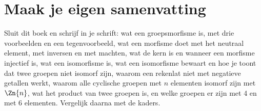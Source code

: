 
\ifzelfstudie
\section*{Maak je eigen samenvatting}
Sluit dit boek en schrijf in je schrift: wat een groepsmorfisme is, met drie voorbeelden en een tegenvoorbeeld, wat een morfisme doet met het neutraal element, met inversen en met machten, wat de kern is en wanneer een morfisme injectief is, wat een isomorfisme is, wat een isomorfisme bewaart en hoe je toont dat twee groepen niet isomorf zijn, waarom een rekenlat niet met negatieve getallen werkt, waarom alle cyclische groepen met $n$ elementen isomorf zijn met $\Zn{n}$, wat het product van twee groepen is, en welke groepen er zijn met 4 en met 6 elementen. Vergelijk daarna met de kaders.
\fi
